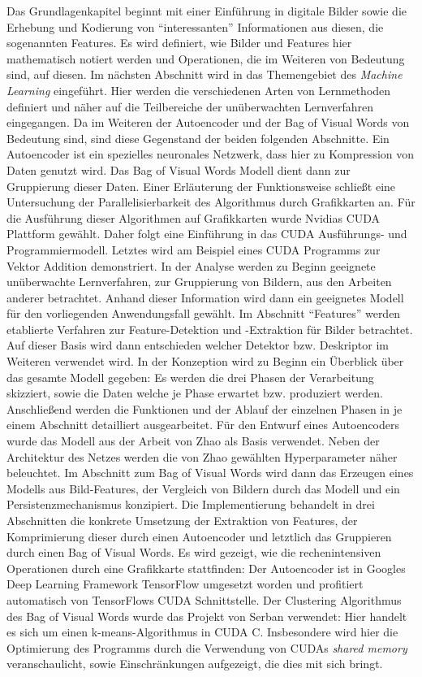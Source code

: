 Das Grundlagenkapitel beginnt mit einer Einführung in digitale Bilder sowie die Erhebung und Kodierung von \enquote{interessanten} Informationen aus diesen, die sogenannten Features. Es wird definiert, wie Bilder und Features hier mathematisch notiert werden und Operationen, die im Weiteren von Bedeutung sind, auf diesen.
Im nächsten Abschnitt wird in das Themengebiet des \textit{Machine Learning} eingeführt. Hier werden die verschiedenen Arten von Lernmethoden definiert und näher auf die Teilbereiche der unüberwachten Lernverfahren eingegangen. Da im Weiteren der Autoencoder und der Bag of Visual Words von Bedeutung sind, sind diese Gegenstand der beiden folgenden Abschnitte. Ein Autoencoder ist ein spezielles neuronales Netzwerk, dass hier zu Kompression von Daten genutzt wird. Das Bag of Visual Words Modell dient dann zur Gruppierung dieser Daten. Einer Erläuterung der Funktionsweise schließt eine Untersuchung der Parallelisierbarkeit des Algorithmus durch Grafikkarten an. 
Für die Ausführung dieser Algorithmen auf Grafikkarten wurde Nvidias CUDA Plattform gewählt. Daher folgt eine Einführung in das CUDA Ausführungs- und Programmiermodell. Letztes wird am Beispiel eines CUDA Programms zur Vektor Addition demonstriert.\newline
In der Analyse werden zu Beginn geeignete unüberwachte Lernverfahren, zur Gruppierung von Bildern, aus den Arbeiten anderer betrachtet. Anhand dieser Information wird dann ein geeignetes Modell für den vorliegenden Anwendungsfall gewählt. Im Abschnitt \enquote{Features} werden etablierte Verfahren zur Feature-Detektion und -Extraktion für Bilder betrachtet. Auf dieser Basis wird dann entschieden welcher Detektor bzw. Deskriptor im Weiteren verwendet wird. \newline
In der Konzeption wird zu Beginn ein Überblick über das gesamte Modell gegeben: Es werden die drei Phasen der Verarbeitung skizziert, sowie die Daten welche je Phase erwartet bzw. produziert werden. Anschließend werden die Funktionen und der Ablauf der einzelnen Phasen in je einem Abschnitt detailliert ausgearbeitet. Für den Entwurf eines Autoencoders wurde das Modell aus der Arbeit von Zhao \cite{aed2016} als Basis verwendet. Neben der Architektur des Netzes werden die von Zhao gewählten Hyperparameter näher beleuchtet. Im Abschnitt zum Bag of Visual Words wird dann das Erzeugen eines Modells aus Bild-Features, der Vergleich von Bildern durch das Modell und ein Persistenzmechanismus konzipiert. \newline
Die Implementierung behandelt in drei Abschnitten die konkrete Umsetzung der Extraktion von Features, der Komprimierung dieser durch einen Autoencoder und letztlich das Gruppieren durch einen Bag of Visual Words. Es wird gezeigt, wie die  rechenintensiven Operationen durch eine Grafikkarte stattfinden: Der Autoencoder ist in Googles Deep Learning Framework TensorFlow umgesetzt worden und profitiert automatisch von TensorFlows CUDA Schnittstelle. Der Clustering Algorithmus des Bag of Visual Words wurde das Projekt von Serban verwendet: Hier handelt es sich um einen k-means-Algorithmus in CUDA C. Insbesondere wird hier die Optimierung des Programms durch die Verwendung von CUDAs \textit{shared memory} veranschaulicht, sowie Einschränkungen aufgezeigt, die dies mit sich bringt.\newline
